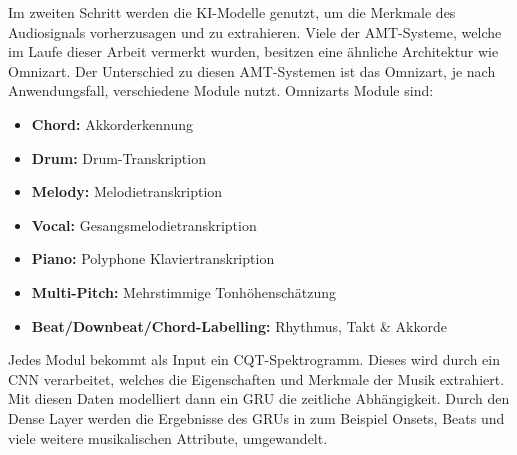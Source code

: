 Im zweiten Schritt werden die KI-Modelle genutzt, um die Merkmale des Audiosignals vorherzusagen und zu extrahieren.
Viele der AMT-Systeme, welche im Laufe dieser Arbeit vermerkt wurden, besitzen eine ähnliche Architektur wie Omnizart.
\cite{hawthorne2017onsets}
Der Unterschied zu diesen AMT-Systemen ist das Omnizart, je nach Anwendungsfall, verschiedene Module nutzt.
Omnizarts Module sind:
\begin{itemize}
    \item \textbf{Chord:} Akkorderkennung
    \item \textbf{Drum:} Drum-Transkription
    \item \textbf{Melody:} Melodietranskription
    \item \textbf{Vocal:} Gesangsmelodietranskription
    \item \textbf{Piano:} Polyphone Klaviertranskription
    \item \textbf{Multi-Pitch:} Mehrstimmige Tonhöhenschätzung
    \item \textbf{Beat/Downbeat/Chord-Labelling:} Rhythmus, Takt \& Akkorde
\end{itemize}
Jedes Modul bekommt als Input ein CQT-Spektrogramm.
Dieses wird durch ein CNN verarbeitet, welches die Eigenschaften und Merkmale der Musik extrahiert.
Mit diesen Daten modelliert dann ein GRU die zeitliche Abhängigkeit.
Durch den Dense Layer werden die Ergebnisse des GRUs in zum Beispiel Onsets,
Beats und viele weitere musikalischen Attribute, umgewandelt.

